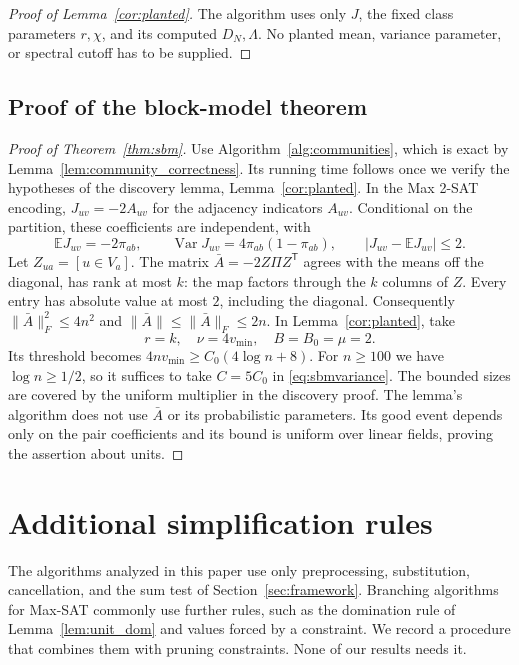 \documentclass[11pt,a4paper]{article}
\theoremstyle{definition}
\theoremstyle{remark}
\newcommand{\E}{\mathbb E}
\begin{document}
\begin{proof}[Proof of Lemma~\ref{cor:planted}]
The algorithm uses only $J$, the fixed class parameters $r,\chi$, and
its computed $D_N,\Lambda$. No planted mean, variance parameter, or
spectral cutoff has to be supplied.
\end{proof}

\subsection{Proof of the block-model theorem}\label{app:sbm_proof}

\begin{proof}[Proof of Theorem~\ref{thm:sbm}]
Use Algorithm~\ref{alg:communities}, which is exact by
Lemma~\ref{lem:community_correctness}. Its running time follows once we
verify the hypotheses of the discovery lemma, Lemma~\ref{cor:planted}. In the Max 2-SAT encoding,
$J_{uv}=-2A_{uv}$ for the adjacency indicators $A_{uv}$. Conditional on
the partition, these coefficients are independent, with
\[
 \E J_{uv}=-2\pi_{ab},\qquad
 \operatorname{Var}J_{uv}=4\pi_{ab}(1-\pi_{ab}),\qquad
 |J_{uv}-\E J_{uv}|\le2.
\]
Let $Z_{ua}=[u\in V_a]$. The matrix
$\bar A=-2Z\Pi Z^{\mathsf T}$ agrees with the means off the diagonal,
has rank at most $k$: the map factors through the $k$ columns of $Z$.
Every entry has absolute value at most $2$, including the diagonal.
Consequently $\|\bar A\|_F^2\le4n^2$ and
$\|\bar A\|\le\|\bar A\|_F\le2n$.
In Lemma~\ref{cor:planted}, take
\[
 r=k,\quad \nu=4v_{\min},\quad B=B_0=\mu=2.
\]
Its threshold becomes
$4n v_{\min}\ge C_0(4\log n+8)$. For $n\ge100$ we have
$\log n\ge1/2$, so it suffices to take $C=5C_0$ in
\eqref{eq:sbmvariance}. The bounded sizes are covered by the uniform
multiplier in the discovery proof.
The lemma's algorithm does not use $\bar A$ or its probabilistic
parameters. Its good event depends only on the pair coefficients and its
bound is uniform over linear fields, proving the assertion about units.
\end{proof}

\section{Additional simplification rules}\label{app:simplify}

The algorithms analyzed in this paper use only preprocessing, substitution,
cancellation, and the sum test of Section~\ref{sec:framework}. Branching
algorithms for Max-SAT commonly use further rules, such as the domination
rule of Lemma~\ref{lem:unit_dom} and values forced by a constraint. We
record a procedure that combines them with pruning constraints. None of our
results needs it.
\end{document}
